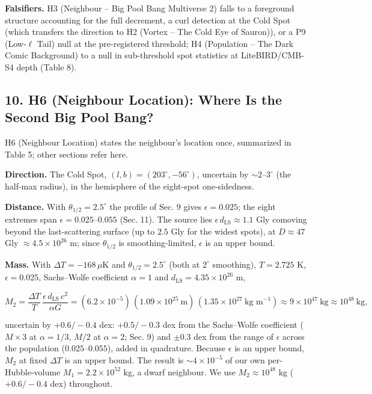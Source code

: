 \documentclass[
  11pt,
]{article}
\begin{document}
\textbf{Falsifiers.} H3 (Neighbour -- Big Pool Bang Multiverse 2) falls
to a foreground structure accounting for the full decrement, a curl
detection at the Cold Spot (which transfers the direction to H2 (Vortex
-- The Cold Eye of Sauron)), or a P9 (Low-\(\ell\) Tail) null at the
pre-registered threshold; H4 (Population -- The Dark Comic Background)
to a null in sub-threshold spot statistics at LiteBIRD/CMB-S4 depth
(Table 8).

\hypertarget{h6-neighbour-location-where-is-the-second-big-pool-bang}{%
\subsection{\texorpdfstring{\textbf{10. H6 (Neighbour Location): Where
Is the Second Big Pool
Bang?}}{10. H6 (Neighbour Location): Where Is the Second Big Pool Bang?}}\label{h6-neighbour-location-where-is-the-second-big-pool-bang}}

H6 (Neighbour Location) states the neighbour's location once, summarized
in Table 5; other sections refer here.

\textbf{Direction.} The Cold Spot, \((l, b) = (203^\circ, -56^\circ)\),
uncertain by \(\sim\!2\)--\(3^\circ\) (the half-max radius), in the
hemisphere of the eight-spot one-sidedness.

\textbf{Distance.} With \(\theta_{1/2} = 2.5^\circ\) the profile of Sec.
9 gives \(\epsilon = 0.025\); the eight extremes span
\(\epsilon = 0.025\)--\(0.055\) (Sec. 11). The source lies
\(\epsilon\,d_{\text{LS}} \approx 1.1\) Gly comoving beyond the
last-scattering surface (up to \(2.5\) Gly for the widest spots), at
\(D \approx 47\) Gly \(\approx 4.5\times10^{26}\) m; since
\(\theta_{1/2}\) is smoothing-limited, \(\epsilon\) is an upper bound.

\textbf{Mass.} With \(\Delta T = -168\,\mu\)K and
\(\theta_{1/2} = 2.5^\circ\) (both at \(2^\circ\) smoothing),
\(T = 2.725\) K, \(\epsilon = 0.025\), Sachs--Wolfe coefficient
\(\alpha = 1\) and \(d_{\text{LS}} = 4.35\times10^{26}\) m,

\[M_2 = \frac{\Delta T}{T}\,\frac{\epsilon\,d_{\text{LS}}\,c^2}{\alpha G} = (6.2\times10^{-5})\,(1.09\times10^{25}\ \text{m})\,(1.35\times10^{27}\ \text{kg m}^{-1}) \approx 9\times10^{47}\ \text{kg} \approx 10^{48}\ \text{kg},\]

uncertain by \(+0.6/-0.4\) dex: \(+0.5/-0.3\) dex from the Sachs--Wolfe
coefficient (\(M \times 3\) at \(\alpha = 1/3\), \(M/2\) at
\(\alpha = 2\); Sec. 9) and \(\pm 0.3\) dex from the range of
\(\epsilon\) across the population (\(0.025\)--\(0.055\)), added in
quadrature. Because \(\epsilon\) is an upper bound, \(M_2\) at fixed
\(\Delta T\) is an upper bound. The result is \(\sim\!4\times10^{-5}\)
of our own per-Hubble-volume \(M_1 = 2.2\times10^{52}\) kg, a dwarf
neighbour. We use \(M_2 \approx 10^{48}\) kg (\(+0.6/-0.4\) dex)
throughout.
\end{document}
